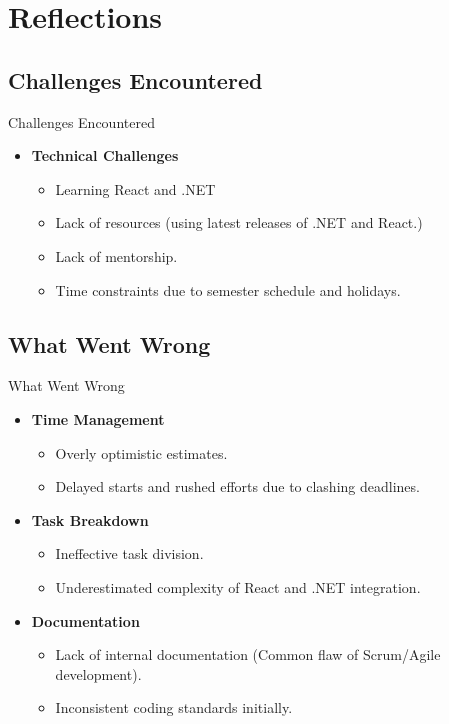\documentclass{beamer}
\begin{document}
\section{Reflections}

\subsection{Challenges Encountered}
\begin{frame}{Challenges Encountered}
    \begin{itemize}
        \item \textbf{Technical Challenges}
        \begin{itemize}
            \item Learning React and .NET
            \item Lack of resources (using latest releases of .NET and React.)
            \item Lack of mentorship.
            \item Time constraints due to semester schedule and holidays.
        \end{itemize}
    \end{itemize}
\end{frame}

\subsection{What Went Wrong}
\begin{frame}{What Went Wrong}
    \begin{itemize}
        \item \textbf{Time Management}
        \begin{itemize}
            \item Overly optimistic estimates.
            \item Delayed starts and rushed efforts due to clashing deadlines.
        \end{itemize}
        \item \textbf{Task Breakdown}
        \begin{itemize}
            \item Ineffective task division.
            \item Underestimated complexity of React and .NET integration.
        \end{itemize}
        \item \textbf{Documentation}
        \begin{itemize}
            \item Lack of internal documentation (Common flaw of Scrum/Agile development).
            \item Inconsistent coding standards initially.
        \end{itemize}
    \end{itemize}
\end{frame}
\end{document}
